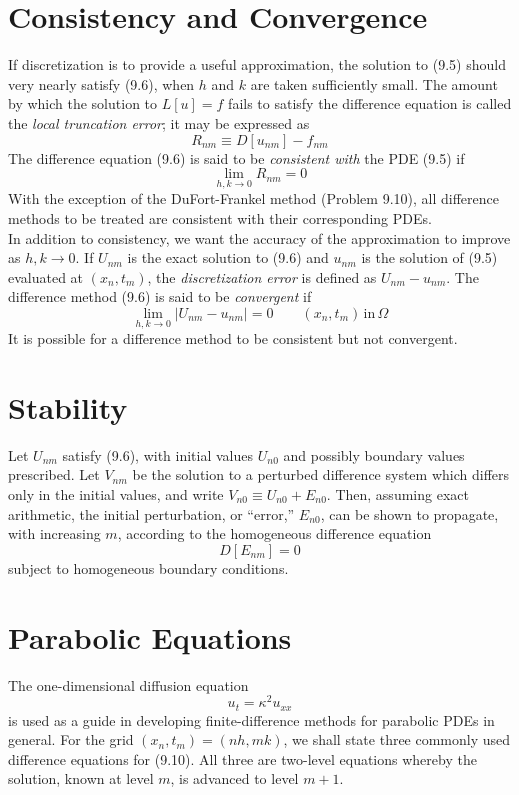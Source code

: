 \documentclass[11pt]{book}
\theoremstyle{example}
\theoremstyle{problem}
\theoremstyle{theorem}
\theoremstyle{definition}
\begin{document}
\section{Consistency and Convergence}
If discretization is to provide a useful approximation, the solution to (9.5) should very nearly satisfy (9.6), when $h$ and $k$ are taken sufficiently small. The amount by which the solution to $L[u]=f$ fails to satisfy the difference equation is called the \emph{local truncation error}; it may be expressed as
\begin{equation*}
	R_{nm}{\equiv}D[u_{nm}]-f_{nm}
\end{equation*}
The difference equation (9.6) is said to be \emph{consistent with} the PDE (9.5) if
\begin{equation}
	\lim\limits_{h,k\rightarrow0}R_{nm}=0
\end{equation}
With the exception of the DuFort-Frankel method (Problem 9.10), all difference methods to be treated are consistent with their corresponding PDEs.\\
In addition to consistency, we want the accuracy of the approximation to improve as $h,k\rightarrow0$. If $U_{nm}$ is the exact solution to (9.6) and $u_{nm}$ is the solution of (9.5) evaluated at $(x_n,t_m)$, the \emph{discretization error} is defined as $U_{nm}-u_{nm}$. The difference method (9.6) is said to be \emph{convergent} if
\begin{equation}
	\lim\limits_{h,k\rightarrow0}|U_{nm}-u_{nm}|=0\qquad(x_n,t_m)\,\mathrm{in}\,\Omega
\end{equation}
It is possible for a difference method to be consistent but not convergent.
\section{Stability}
Let $U_{nm}$ satisfy (9.6), with initial values $U_{n0}$ and possibly boundary values prescribed. Let $V_{nm}$ be the solution to a perturbed difference system which differs only in the initial values, and write $V_{n0}{\equiv}U_{n0}+E_{n0}$. Then, assuming exact arithmetic, the initial perturbation, or ``error,'' $E_{n0}$, can be shown to propagate, with increasing $m$, according to the homogeneous difference equation
\begin{equation*}
	D[E_{nm}]=0
\end{equation*}
subject to homogeneous boundary conditions.
\section{Parabolic Equations}
The one-dimensional diffusion equation
\begin{equation}
	u_t=\kappa^2u_{xx}
\end{equation}
is used as a guide in developing finite-difference methods for parabolic PDEs in general. For the grid $(x_n,t_m)=(nh,mk)$, we shall state three commonly used difference equations for (9.10). All three are two-level equations whereby the solution, known at level $m$, is advanced to level $m+1$.
\end{document}
